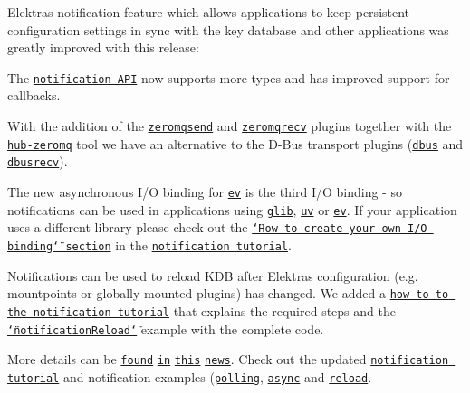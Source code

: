 Elektra\textquotesingle{}s notification feature which allows applications to keep persistent configuration settings in sync with the key database and other applications was greatly improved with this release\+:


\begin{DoxyItemize}
\item The \href{https://doc.libelektra.org/api/current/html/group__kdbnotification.html}{\tt notification A\+PI} now supports more types and has improved support for callbacks.
\item With the addition of the \href{https://www.libelektra.org/plugins/zeromqsend}{\tt zeromqsend} and \href{https://www.libelektra.org/plugins/zeromqrecv}{\tt zeromqrecv} plugins together with the \href{https://www.libelektra.org/tools/hub-zeromq}{\tt hub-\/zeromq} tool we have an alternative to the D-\/\+Bus transport plugins (\href{https://www.libelektra.org/plugins/dbus}{\tt dbus} and \href{https://www.libelektra.org/plugins/dbusrecv}{\tt dbusrecv}).
\item The new asynchronous I/O binding for \href{https://www.libelektra.org/bindings/io_ev}{\tt ev} is the third I/O binding -\/ so notifications can be used in applications using \href{https://www.libelektra.org/bindings/io_glib}{\tt glib}, \href{https://www.libelektra.org/bindings/io_uv}{\tt uv} or \href{https://www.libelektra.org/bindings/io_ev}{\tt ev}. If your application uses a different library please check out the \href{https://www.libelektra.org/tutorials/notifications#how-to-create-your-own-i-o-binding}{\tt \char`\"{}\+How to create your own I/\+O binding\char`\"{} section} in the \href{https://www.libelektra.org/tutorials/notifications}{\tt notification tutorial}.
\item Notifications can be used to reload K\+DB after Elektra\textquotesingle{}s configuration (e.\+g. mountpoints or globally mounted plugins) has changed. We added a \href{https://www.libelektra.org/tutorials/notifications#howto-reload-kdb-when-elektras-configuration-has-changed}{\tt how-\/to to the notification tutorial} that explains the required steps and the \href{https://www.libelektra.org/examples/notificationreload}{\tt \char`\"{}notification\+Reload\char`\"{}} example with the complete code.
\end{DoxyItemize}

More details can be \href{#zeromq-transport-plugins}{\tt found} \href{#misc}{\tt in} \href{#bindings}{\tt this} \href{#notifications}{\tt news}. Check out the updated \href{https://www.libelektra.org/tutorials/notifications}{\tt notification tutorial} and notification examples (\href{https://www.libelektra.org/examples/notificationpolling}{\tt polling}, \href{https://www.libelektra.org/examples/notificationasync}{\tt async} and \href{https://www.libelektra.org/examples/notificationreload}{\tt reload}.

